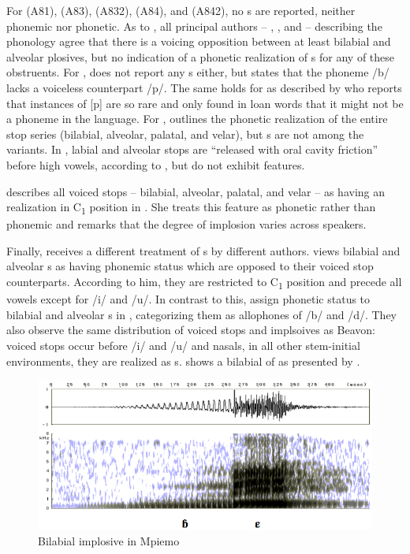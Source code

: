 \documentclass[output=paper,modfonts,nonflat,
 hidelinks
]{langsci/langscibook}
\begin{document}
For  (A81),  (A83),  (A832),  (A84), and  (A842), no s are reported, neither phonemic nor phonetic.   As to , all principal authors -- \citet{Lemb1974}, \citet{Dieu1976}, and \citet{Yemmene2004} -- describing the phonology agree that there is a voicing opposition between at least bilabial and alveolar plosives, but no indication of a phonetic realization of s for any of these obstruents.  For , \citet{Heath2003} does not report any s either, but states that the phoneme /b/ lacks a voiceless counterpart /p/. The same holds for  as described by \citet{Henson2007} who reports that instances of [p] are so rare and only found in loan words that it might not be a phoneme in the language. For , \citet{Beavon2006} outlines the phonetic realization of the entire stop series (bilabial, alveolar, palatal, and velar), but s are not among the variants. In , labial and alveolar stops are ``released with oral cavity friction'' before high vowels, according to \citet[134]{Beavon1983}, but do not exhibit  features.


\citet[147]{Cheucle2014} describes all voiced stops -- bilabial, alveolar, palatal, and velar -- as having an  realization in C\textsubscript{1} position in . She treats this feature as phonetic rather than phonemic and remarks that the degree of implosion varies across speakers.

Finally,  receives a different treatment of s by different authors.  \citet{Beavon1978} views bilabial and alveolar s as having phonemic status which are opposed to their voiced stop counterparts. According to him, they are restricted to C\textsubscript{1} position and precede all vowels except for /i/ and /u/. In contrast to this, \citet{Thornell2004} assign phonetic status to bilabial and alveolar s in , categorizing them as allophones of /b/ and /d/. They also observe the same distribution of voiced stops and implsoives as Beavon: voiced stops occur before /i/ and /u/ and nasals, in all other stem-initial environments, they are realized as s.  shows a bilabial  of  as presented by \citet[172]{Thornell2004}.

\begin{figure}
\caption{Bilabial {implosive} in Mpiemo} 
\label{fig:grimm:1}
\includegraphics[width=\textwidth]{figures/mpiemoB.jpg}
\end{figure}
\end{document}

